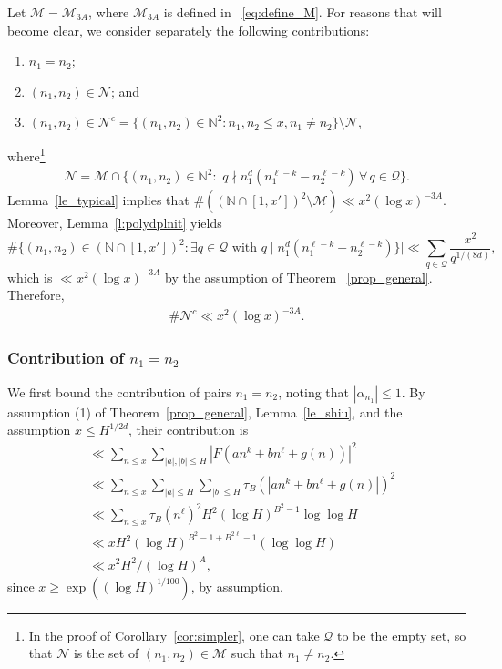 \documentclass[11pt,letterpaper]{amsart}
\renewcommand{\leq}{\leqslant}
\renewcommand{\geq}{\geqslant}
\theoremstyle{definition}
\numberwithin{equation}{section}
\newcommand\N{\mathbb{N}}
\newcommand{\0}{\mathbf{0}}
\begin{document}
Let $\mathscr{M}=\mathscr{M}_{3A}$, where $\mathcal{M}_{3A}$ is defined in ~\eqref{eq:define_M}. 
For reasons that will become clear, we consider separately the following  contributions:
\begin{enumerate}
\item  $n_1=n_2$;
\item   $(n_1,n_2)\in \mathcal{N}$; and 
\item $(n_1,n_2)\in \mathcal{N}^{c}=\{(n_1,n_2)\in \N^2:n_1,n_2\leq x, n_1\neq n_2\}\setminus \mathcal{N}$, 
\end{enumerate} 
where\footnote{\label{foot2}In the proof of Corollary~\ref{cor:simpler}, one can take $\mathcal{Q}$ to be the empty set, so that $\mathscr{N}$ is the set of $(n_1,n_2)\in \mathcal{M}$ such that $n_1\neq n_2$.}
\begin{align*}
\mathcal{N}=\mathcal{M}\cap \{(n_1, n_2)\in \N^2:\,\, q\nmid n_1^d( n_1^{\ell-k}-n_2^{\ell-k})\,\forall\,q\in \mathcal{Q}\}.
\end{align*}
Lemma~\ref{le_typical} implies that  
$\#((\N\cap [1,x'])^2\setminus \mathcal{M})\ll x^2(\log x)^{-3A}$. Moreover, Lemma~\ref{l:polydplnit} yields
$$
\#\{(n_1, n_2)\in (\N\cap[1,x'])^2:
\exists q\in \mathcal{Q}  \textrm{ with } 
 q\mid n_1^d( n_1^{\ell-k}-n_2^{\ell-k}) \}|
\ll \sum_{q\in \mathcal{Q}}
\frac{x^2}{q^{1/(8d)}},$$  which is $\ll x^2 (\log x)^{-3A}$ by the assumption of 
Theorem ~\ref{prop_general}.
Therefore, 
\begin{align}\label{nbound}
\#\mathcal{N}^c\ll x^2(\log x)^{-3A}.
\end{align}

\subsubsection*{Contribution of $n_1=n_2$} We first bound the contribution of pairs $n_1=n_2$, noting that 
$|\alpha_{n_1}|\leq 1$. By assumption (1) of Theorem~\ref{prop_general}, Lemma~\ref{le_shiu}, and the assumption $x\leq H^{1/2d}$, their contribution is
\begin{align*}
&\ll \sum_{n\leq x} \sum_{|a|,|b|\leq H}|F(an^k+bn^{\ell}+g(n))|^2\\
&\ll \sum_{n\leq x}\sum_{|a|\leq H}\sum_{|b|\leq H}\tau_B(|an^k+bn^{\ell}+g(n)|)^2\\  
&\ll \sum_{n\leq x}\tau_B(n^{\ell})^2H^2(\log H)^{B^2-1}\log \log H\\
&\ll xH^2(\log H)^{B^2-1+B^{2\ell}-1}(\log \log H)\\
&\ll x^2H^2/(\log H)^{A},
\end{align*}
since $x\geq \exp((\log H)^{1/100})$, by assumption. 
\end{document}
